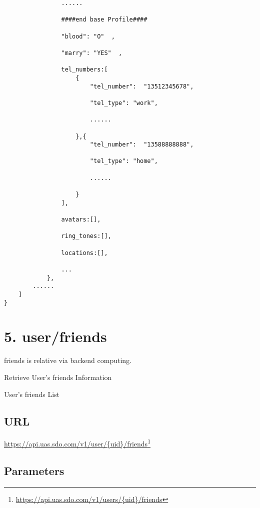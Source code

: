 \begin{verbatim}
                ......

                ####end base Profile####

                "blood": "O"  ,

                "marry": "YES"  ,

                tel_numbers:[
                    {
                        "tel_number":  "13512345678",

                        "tel_type": "work",

                        ......

                    },{
                        "tel_number":  "13588888888",

                        "tel_type": "home",

                        ......

                    }
                ],

                avatars:[],

                ring_tones:[],

                locations:[],

                ...
            },
        ......                  
    ]
}
\end{verbatim}


\chapter{5. user\slash friends}
\label{userfriends}

friends is relative via backend computing.

Retrieve User's friends Information

User's friends List

\section{URL}
\label{url}

\href{https://api.uas.sdo.com/v1/users/{uid}/friends}{https:/\slash api.uas.sdo.com\slash v1\slash user\slash \{uid\}\slash friends}\footnote{\href{https://api.uas.sdo.com/v1/users/{uid}/friends}{https:/\slash api.uas.sdo.com\slash v1\slash users\slash \{uid\}\slash friends}}

\section{Parameters}
\label{parameters}

